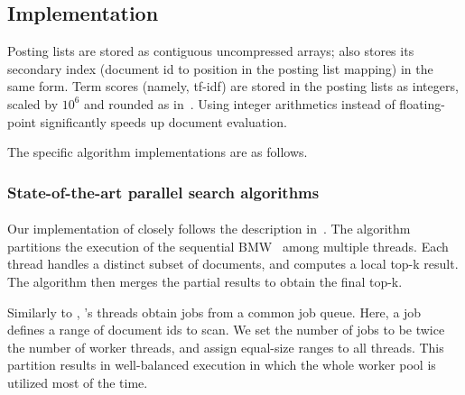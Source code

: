 {

\subsection{Implementation}
\label{ssec:implementation}

Posting lists are stored as contiguous uncompressed arrays;  {\pRA} also stores 
its secondary index (document id to position in the posting list mapping) in the same form. 
Term scores (namely, tf-idf) are stored in the posting lists as integers, scaled by $10^6$ and rounded as in~\cite{Bortnikov:2017}. 
Using integer arithmetics instead of floating-point significantly speeds up document evaluation. 

The specific algorithm implementations are as follows.

\subsubsection{State-of-the-art parallel search algorithms}

\paragraph{\pBMW}
Our implementation of {\pBMW} closely follows the description in~\cite{rojas2013distributing}. The algorithm partitions the execution of the 
sequential BMW~\cite{Ding:2011} among multiple threads. Each thread handles a distinct subset of documents, and computes a local top-k 
result. The algorithm then merges the partial results to obtain the final top-k. 

Similarly to \alg, \pBMW's threads obtain jobs from a common job queue. Here, a job defines a range of document ids to scan. 
We set the number of jobs to be twice the number of worker threads, and assign equal-size ranges to all threads.  
This partition results in well-balanced execution in which the whole worker pool is utilized 
most of the time. 

}
